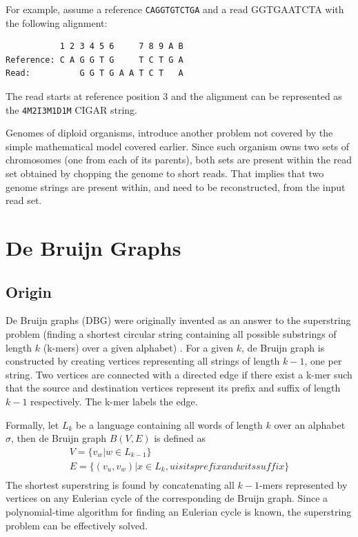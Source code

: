 For example, assume a reference \texttt{CAGGTGTCTGA} and a read GGTGAATCTA with the following alignment:
\begin{verbatim}
           1 2 3 4 5 6     7 8 9 A B
Reference: C A G G T G     T C T G A
Read:          G G T G A A T C T   A
\end{verbatim}
The read starts at reference position 3 and the alignment can be represented as the \texttt{4M2I3M1D1M} CIGAR string.

Genomes of diploid organisms, introduce another problem not covered by the simple mathematical model covered earlier. Since such organism owns two sets of chromosomes (one from each of its parents), both sets are present within the read set obtained by chopping the genome to short reads. That implies that two genome strings are present within, and need to be reconstructed, from the input read set.

\section{De Bruijn Graphs}
\label{sec:de-bruijn-graphs}

\subsection{Origin}
\label{subsec:dbg-origin}

De Bruijn graphs (DBG) were originally invented as an answer to the superstring problem  (finding a shortest circular string containing all possible substrings of length $k$ (k-mers) over a given alphabet) \cite{dbg-apply}. For a given $k$, de Bruijn graph is constructed by creating vertices representing all strings of length $k-1$, one per string. Two vertices are connected with a directed edge if there exist a k-mer such that the source and destination vertices represent its prefix and suffix of length $k-1$ respectively. The k-mer labels the edge. 

Formally, let $L_k$ be a language containing all words of length $k$ over an alphabet $\sigma$, then de Bruijn graph $B(V, E)$ is defined as
\begin{gather}
V = \{v_w | w \in L_{k-1}\} \\
E = \{(v_u, v_w) | x \in L_k,  u is its prefix and w its suffix \} \\
\end{gather}
The shortest superstring is found by concatenating all $k-1$-mers represented by vertices on any Eulerian cycle of the corresponding de Bruijn graph. Since a polynomial-time algorithm for finding an Eulerian cycle is known, the superstring problem can be effectively solved.

